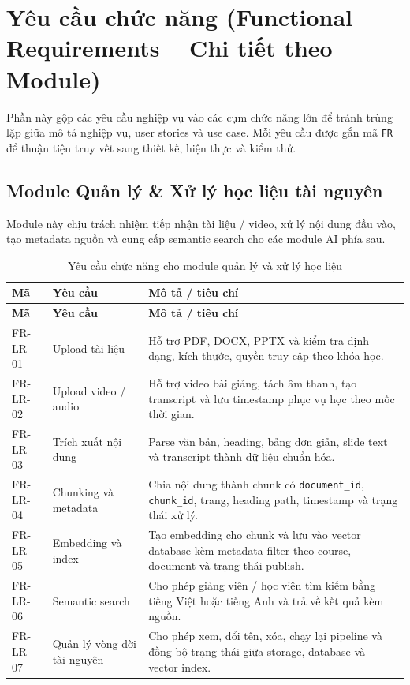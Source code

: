 \section{Yêu cầu chức năng (Functional Requirements -- Chi tiết theo Module)}
\label{sec:yeu-cau-chuc-nang-theo-module}

Phần này gộp các yêu cầu nghiệp vụ vào các cụm chức năng lớn để tránh trùng
lặp giữa mô tả nghiệp vụ, user stories và use case. Mỗi yêu cầu được gắn mã
\texttt{FR} để thuận tiện truy vết sang thiết kế, hiện thực và kiểm thử.

\subsection{Module Quản lý \& Xử lý học liệu tài nguyên}
\label{subsec:module-quan-ly-xu-ly-hoc-lieu}

Module này chịu trách nhiệm tiếp nhận tài liệu / video, xử lý nội dung đầu vào,
tạo metadata nguồn và cung cấp semantic search cho các module AI phía sau.

\begin{longtable}{|p{2.4cm}|p{5.1cm}|p{6.9cm}|}
\caption{Yêu cầu chức năng cho module quản lý và xử lý học liệu}
\label{tab:fr-hoc-lieu}\\
\hline
\textbf{Mã} & \textbf{Yêu cầu} & \textbf{Mô tả / tiêu chí} \\
\hline
\endfirsthead
\hline
\textbf{Mã} & \textbf{Yêu cầu} & \textbf{Mô tả / tiêu chí} \\
\hline
\endhead
FR-LR-01 & Upload tài liệu & Hỗ trợ PDF, DOCX, PPTX và kiểm tra định dạng, kích thước, quyền truy cập theo khóa học. \\
\hline
FR-LR-02 & Upload video / audio & Hỗ trợ video bài giảng, tách âm thanh, tạo transcript và lưu timestamp phục vụ học theo mốc thời gian. \\
\hline
FR-LR-03 & Trích xuất nội dung & Parse văn bản, heading, bảng đơn giản, slide text và transcript thành dữ liệu chuẩn hóa. \\
\hline
FR-LR-04 & Chunking và metadata & Chia nội dung thành chunk có \texttt{document\_id}, \texttt{chunk\_id}, trang, heading path, timestamp và trạng thái xử lý. \\
\hline
FR-LR-05 & Embedding và index & Tạo embedding cho chunk và lưu vào vector database kèm metadata filter theo course, document và trạng thái publish. \\
\hline
FR-LR-06 & Semantic search & Cho phép giảng viên / học viên tìm kiếm bằng tiếng Việt hoặc tiếng Anh và trả về kết quả kèm nguồn. \\
\hline
FR-LR-07 & Quản lý vòng đời tài nguyên & Cho phép xem, đổi tên, xóa, chạy lại pipeline và đồng bộ trạng thái giữa storage, database và vector index. \\
\hline
\end{longtable}

